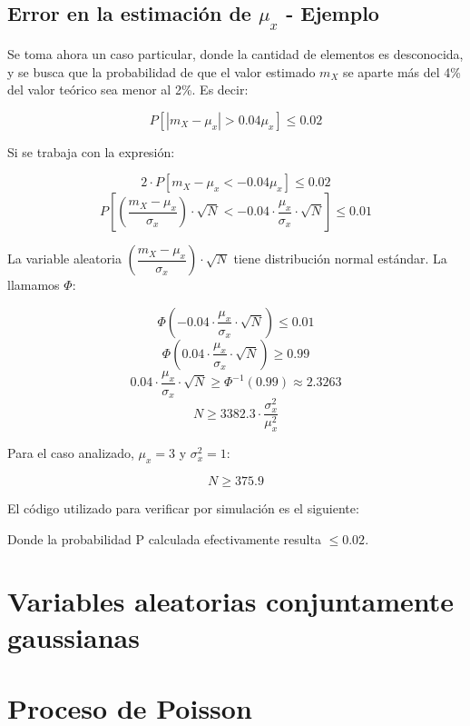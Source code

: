 \subsection{Error en la estimaci\'on de $\mu_x$ - Ejemplo}

Se toma ahora un caso particular, donde la cantidad de elementos es desconocida, y se busca que la probabilidad de que el valor estimado $m_X$ se aparte m\'as del 4\% del valor te\'orico sea menor al 2\%. Es decir:

\[
P[|m_X - \mu_x| > 0.04\mu_x] \leq 0.02
\]

Si se trabaja con la expresi\'on:

\[
2 \cdot P[m_X - \mu_x < -0.04\mu_x] \leq 0.02
\]
\[
P[\left( \frac{m_X - \mu_x}{\sigma_x} \right) \cdot \sqrt{N} < -0.04 \cdot \frac{\mu_x}{\sigma_x} \cdot \sqrt{N}] \leq 0.01
\]

La variable aleatoria $\left( \dfrac{m_X - \mu_x}{\sigma_x} \right) \cdot \sqrt{N}$ tiene distribuci\'on normal est\'andar. La llamamos $\Phi$:

\[
\Phi \left( -0.04 \cdot \frac{\mu_x}{\sigma_x} \cdot \sqrt{N} \right) \leq 0.01
\]
\[
\Phi \left( 0.04 \cdot \frac{\mu_x}{\sigma_x} \cdot \sqrt{N} \right) \geq 0.99
\]
\[
0.04 \cdot \frac{\mu_x}{\sigma_x} \cdot \sqrt{N} \geq \Phi^{-1}(0.99) \approx 2.3263
\]
\[
N \geq 3382.3 \cdot \frac{\sigma^2_x}{\mu^2_x}
\]

Para el caso analizado, $\mu_x = 3$ y $\sigma^2_x = 1$:

\[
N \geq 375.9
\]

El c\'odigo utilizado para verificar por simulaci\'on es el siguiente:



Donde la probabilidad P calculada efectivamente resulta $\leq 0.02$.

\section{Variables aleatorias conjuntamente gaussianas}

\section{Proceso de Poisson}

